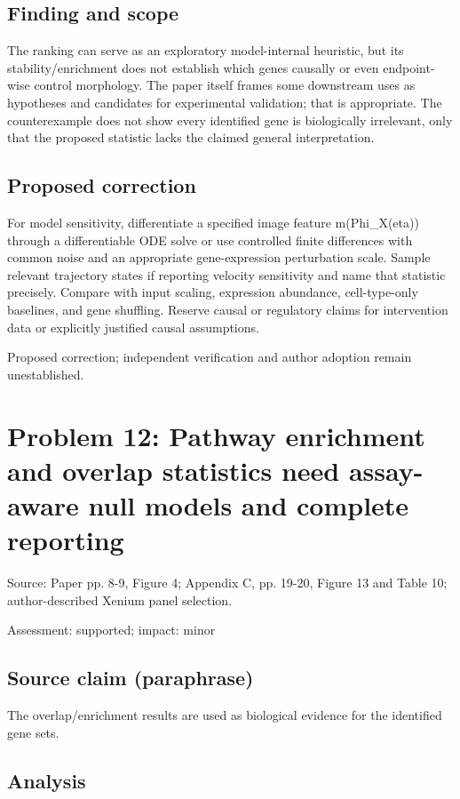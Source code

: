 \documentclass[11pt]{article}
\begin{document}
\subsection*{Finding and scope}

The ranking can serve as an exploratory model-internal heuristic, but its stability/enrichment does not establish which genes causally or even endpoint-wise control morphology. The paper itself frames some downstream uses as hypotheses and candidates for experimental validation; that is appropriate. The counterexample does not show every identified gene is biologically irrelevant, only that the proposed statistic lacks the claimed general interpretation.

\subsection*{Proposed correction}

For model sensitivity, differentiate a specified image feature m(Phi\_X(eta)) through a differentiable ODE solve or use controlled finite differences with common noise and an appropriate gene-expression perturbation scale. Sample relevant trajectory states if reporting velocity sensitivity and name that statistic precisely. Compare with input scaling, expression abundance, cell-type-only baselines, and gene shuffling. Reserve causal or regulatory claims for intervention data or explicitly justified causal assumptions.

Proposed correction; independent verification and author adoption remain unestablished.

\section*{Problem 12: Pathway enrichment and overlap statistics need assay-aware null models and complete reporting}

Source: Paper pp. 8-9, Figure 4; Appendix C, pp. 19-20, Figure 13 and Table 10; author-described Xenium panel selection.

Assessment: supported; impact: minor

\subsection*{Source claim (paraphrase)}

The overlap/enrichment results are used as biological evidence for the identified gene sets.

\subsection*{Analysis}
\end{document}
